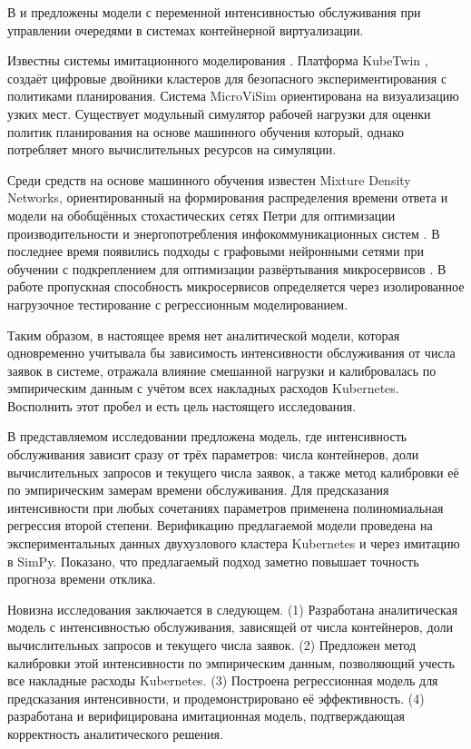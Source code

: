 \documentclass[12pt,a4paper]{article}
\begin{document}
В \cite{berner2025improved} и \cite{cai2021inverse} предложены модели с переменной интенсивностью обслуживания при управлении очередями в системах контейнерной виртуализации.

Известны системы имитационного моделирования \cite{Santos2026KubeTwin2D, lin2025microvisim, touloupoumodular}. Платформа KubeTwin \cite{Santos2026KubeTwin2D}, создаёт цифровые двойники кластеров для безопасного экспериментирования с политиками планирования. Система MicroViSim \cite{lin2025microvisim} ориентирована на визуализацию узких мест. Существует модульный симулятор рабочей нагрузки для оценки политик планирования на основе машинного обучения \cite{touloupoumodular} который, однако потребляет много вычислительных ресурсов на симуляции.

Среди средств на основе машинного обучения известен Mixture Density Networks, ориентированный на формирования распределения времени ответа \cite{manca2023characterization} и модели на обобщённых стохастических сетях Петри для оптимизации производительности и энергопотребления инфокоммуникационных систем \cite{fe2025energy}. В последнее время появились подходы с графовыми нейронными сетями \cite{richart2025lq} при обучении с подкреплением для оптимизации развёртывания микросервисов \cite{peng2024delay}. В работе \cite{jindal2019performance} пропускная способность микросервисов определяется через изолированное нагрузочное тестирование с регрессионным моделированием.

Таким образом, в настоящее время нет аналитической модели, которая одновременно учитывала бы зависимость интенсивности обслуживания от числа заявок в системе, отражала влияние смешанной нагрузки и калибровалась по эмпирическим данным с учётом всех накладных расходов Kubernetes. Восполнить этот пробел и есть цель настоящего исследования.

В представляемом исследовании предложена модель, где интенсивность обслуживания зависит сразу от трёх параметров: числа контейнеров, доли вычислительных запросов и текущего числа заявок, а также метод калибровки её по эмпирическим замерам времени обслуживания. Для предсказания интенсивности при любых сочетаниях параметров применена полиномиальная регрессия второй степени. Верификацию предлагаемой модели проведена на экспериментальных данных двухузлового кластера Kubernetes и через имитацию в SimPy. Показано, что предлагаемый подход заметно повышает точность прогноза времени отклика.

Новизна исследования заключается в следующем. (1) Разработана аналитическая модель с интенсивностью обслуживания, зависящей от числа контейнеров, доли вычислительных запросов и текущего числа заявок. (2) Предложен метод калибровки этой интенсивности по эмпирическим данным, позволяющий учесть все накладные расходы Kubernetes. (3) Построена регрессионная модель для предсказания интенсивности, и продемонстрировано её эффективность. (4) разработана и верифицирована имитационная модель, подтверждающая корректность аналитического решения.
\end{document}
